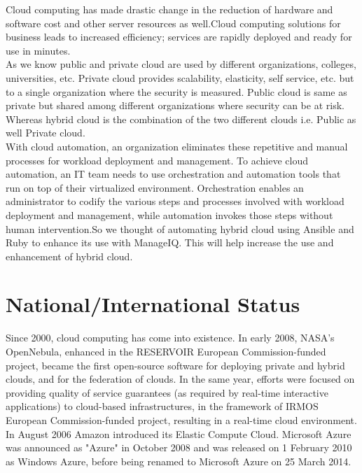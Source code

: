 \documentclass[a4paper,12pt]{report}
\begin{document}
Cloud computing has made drastic change in the reduction of hardware and software cost and other server resources as well.Cloud computing solutions for business leads to increased efficiency; services are rapidly deployed and ready for use in minutes.\\

As we know public and private cloud are used by different organizations, colleges, universities, etc. Private cloud provides scalability, elasticity, self service, etc. but to a single organization where the security is measured. Public cloud is same as private but shared among different organizations where security can be at risk. Whereas hybrid cloud is the combination of the two different clouds i.e. Public as well Private cloud. \\

With cloud automation, an organization eliminates these repetitive and manual processes for workload deployment and management. To achieve cloud automation, an IT team needs to use orchestration and automation tools that run on top of their virtualized environment. Orchestration enables an administrator to codify the various steps and processes involved with workload deployment and management, while automation invokes those steps without human intervention.So we thought of automating hybrid cloud using Ansible and Ruby to enhance its use with ManageIQ. This will help increase the use and enhancement of hybrid cloud.\\

\chapter{National/International Status}

Since 2000, cloud computing has come into existence. In early 2008, NASA's OpenNebula, enhanced in the RESERVOIR European Commission-funded project, became the first open-source software for deploying private and hybrid clouds, and for the federation of clouds. In the same year, efforts were focused on providing quality of service guarantees (as required by real-time interactive applications) to cloud-based infrastructures, in the framework of IRMOS European Commission-funded project, resulting in a real-time cloud environment.\\

In August 2006 Amazon introduced its Elastic Compute Cloud. Microsoft Azure was announced as "Azure" in October 2008 and was released on 1 February 2010 as Windows Azure, before being renamed to Microsoft Azure on 25 March 2014.\\
\end{document}

